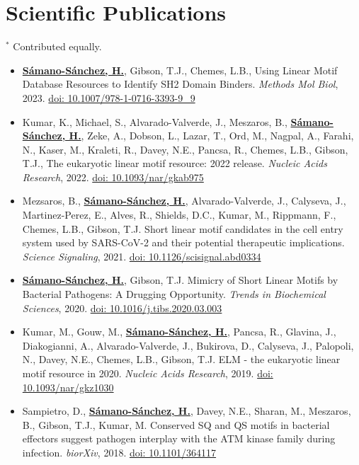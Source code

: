 \documentclass[11pt,a4paper,sans]{moderncv} %
\begin{document}
\section{Scientific Publications}
\vspace{-.1cm}
\footnotesize{$^{\ast}$ Contributed equally.} \hspace{.5cm}
\vspace{.1cm}
\begin{itemize}
  \item \textbf{\underline{S\'amano-S\'anchez, H.}}, Gibson, T.J., Chemes, L.B., Using Linear Motif Database Resources to Identify SH2 Domain Binders. \textit{Methods Mol Biol}, 2023.
  \href{https://doi.org/10.1007/978-1-0716-3393-9_9}{doi: 10.1007/978-1-0716-3393-9\_9}
  \item Kumar, K., Michael, S., Alvarado-Valverde, J., Meszaros, B., \textbf{\underline{S\'amano-S\'anchez, H.}}, Zeke, A., Dobson, L., Lazar, T., Ord, M., Nagpal, A., Farahi, N., Kaser, M., Kraleti, R., Davey, N.E., Pancsa, R., Chemes, L.B., Gibson, T.J., The eukaryotic linear motif resource: 2022 release. \textit{Nucleic Acids Research}, 2022. \href{https://doi.org/10.1093/nar/gkab975}{doi: 10.1093/nar/gkab975}
  \item Mezsaros, B., \textbf{\underline{S\'amano-S\'anchez, H.}}, Alvarado-Valverde, J., Calyseva, J., Martinez-Perez, E., Alves, R., Shields, D.C., Kumar, M., Rippmann, F., Chemes, L.B., Gibson, T.J. Short linear motif candidates in the cell entry system used by SARS-CoV-2 and their potential therapeutic implications. \textit{Science Signaling}, 2021. \href{https://doi.org/10.1126/scisignal.abd0334}{doi: 10.1126/scisignal.abd0334}
  \item \textbf{\underline{S\'amano-S\'anchez, H.}}, Gibson, T.J. Mimicry of Short Linear Motifs by Bacterial Pathogens: A Drugging Opportunity. \textit{Trends in Biochemical Sciences}, 2020. \href{https://doi.org/10.1016/j.tibs.2020.03.003}{doi: 10.1016/j.tibs.2020.03.003}
  \item Kumar, M., Gouw, M., \textbf{\underline{S\'amano-S\'anchez, H.}}, Pancsa, R., Glavina, J., Diakogianni, A., Alvarado-Valverde, J., Bukirova, D., Calyseva, J., Palopoli, N., Davey, N.E., Chemes, L.B., Gibson, T.J. ELM - the eukaryotic linear motif resource in 2020. \textit{Nucleic Acids Research}, 2019. \href{https://doi.org/10.1093/nar/gkz1030}{doi: 10.1093/nar/gkz1030}
  \item Sampietro, D., \textbf{\underline{S\'amano-S\'anchez, H.}}, Davey, N.E., Sharan, M., Meszaros, B., Gibson, T.J., Kumar, M. Conserved SQ and QS motifs in bacterial effectors suggest pathogen interplay with the ATM kinase family during infection. \textit{biorXiv}, 2018. \href{https://doi.org/10.1101/364117}{doi: 10.1101/364117}

\end{itemize}
\end{document}
